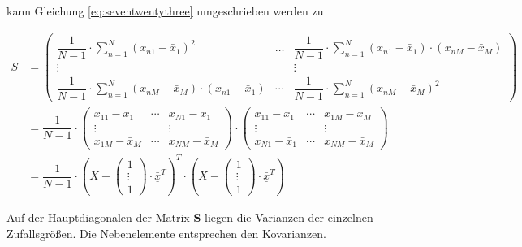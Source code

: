 \noindent kann Gleichung \eqref{eq:seventwentythree} umgeschrieben werden zu

\begin{equation}\label{eq:seventwentysix}
\begin{split}
S & = \left(\begin{array}{ccc} {\dfrac{1}{N-1} \cdot \sum\limits _{n=1}^{N}\left(x_{n1} -\bar{x}_{1} \right)^{2}  } & {\ldots } & {\dfrac{1}{N-1} \cdot \sum\limits _{n=1}^{N}\left(x_{n1} -\bar{x}_{1} \right)\cdot \left(x_{nM} -\bar{x}_{M} \right) } \\ {\vdots } & {} & {\vdots } \\ {\dfrac{1}{N-1} \cdot \sum\limits _{n=1}^{N}\left(x_{nM} -\bar{x}_{M} \right)\cdot \left(x_{n1} -\bar{x}_{1} \right) } & {\cdots } & {\dfrac{1}{N-1} \cdot \sum\limits _{n=1}^{N}\left(x_{nM} -\bar{x}_{M} \right)^{2}  } \end{array}\right) \\ 
& = \dfrac{1}{N-1} \cdot \left(\begin{array}{ccc} {x_{11} -\bar{x}_{1} } & {\cdots } & {x_{N1} -\bar{x}_{1} } \\ {\vdots } & {} & {\vdots } \\ {x_{1M} -\bar{x}_{M} } & {\cdots } & {x_{NM} -\bar{x}_{M} } \end{array}\right)\cdot \left(\begin{array}{ccc} {x_{11} -\bar{x}_{1} } & {\cdots } & {x_{1M} -\bar{x}_{M} } \\ {\vdots } & {} & {\vdots } \\ {x_{N1} -\bar{x}_{1} } & {\cdots } & {x_{NM} -\bar{x}_{M} } \end{array}\right) \\ 
& = \dfrac{1}{N-1} \cdot \left(X-\left(\begin{array}{c} {1} \\ {\vdots } \\ {1} \end{array}\right)\cdot \underline{\bar{x}}^{T} \right)^{T} \cdot \left(X-\left(\begin{array}{c} {1} \\ {\vdots } \\ {1} \end{array}\right)\cdot \underline{\bar{x}}^{T} \right)
\end{split}
\end{equation}

\noindent Auf der Hauptdiagonalen der Matrix \textbf{S} liegen die Varianzen der einzelnen Zufallsgr\"{o}{\ss}en. Die Nebenelemente entsprechen den Kovarianzen. 

